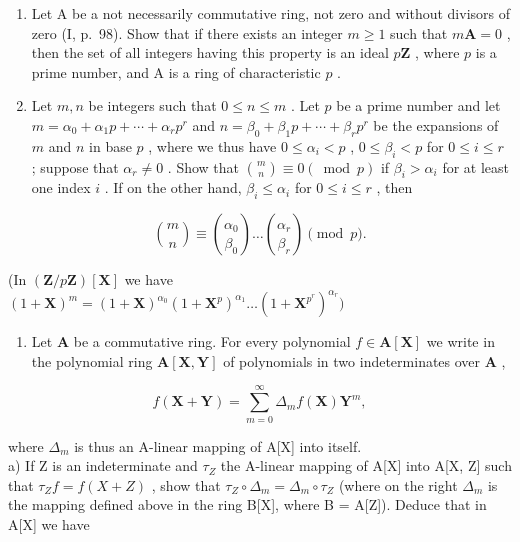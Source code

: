 \BourbakiExerciseGroup

\begin{enumerate}
\def\labelenumi{\arabic{enumi})}
\item
  Let A be a not necessarily commutative ring, not zero and without divisors of zero (I, p.~98). Show that if there exists an integer \(m \geqslant 1\) such that \(m\mathbf{A} = 0\) , then the set of all integers having this property is an ideal \(p\mathbf{Z}\) , where \(p\) is a prime number, and A is a ring of characteristic \(p\) .
\item
  Let \(m, n\) be integers such that \(0 \leqslant n \leqslant m\) . Let \(p\) be a prime number and let \(m = \alpha_0 + \alpha_1p + \cdots + \alpha_rp^r\) and \(n = \beta_0 + \beta_1p + \cdots + \beta_rp^r\) be the expansions of \(m\) and \(n\) in base \(p\) , where we thus have \(0 \leqslant \alpha_i < p\) , \(0 \leqslant \beta_i < p\) for \(0 \leqslant i \leqslant r\) ; suppose that \(\alpha_r \neq 0\) . Show that \(\binom{m}{n} \equiv 0 (\bmod p)\) if \(\beta_i > \alpha_i\) for at least one index \(i\) . If on the other hand, \(\beta_i \leqslant \alpha_i\) for \(0 \leqslant i \leqslant r\) , then
\end{enumerate}

\[
\binom {m} {n} \equiv \binom {\alpha_ {0}} {\beta_ {0}} \dots \binom {\alpha_ {r}} {\beta_ {r}} \pmod {p}  .
\]

(In \((\mathbf{Z} / p\mathbf{Z})[\mathbf{X}]\) we have \((1 + \mathbf{X})^m = (1 + \mathbf{X})^{\alpha_0}(1 + \mathbf{X}^p)^{\alpha_1}\dots (1 + \mathbf{X}^{p^r})^{\alpha_r})\)

\begin{enumerate}
\def\labelenumi{\arabic{enumi})}
\setcounter{enumi}{2}
\tightlist
\item
  Let \(\mathbf{A}\) be a commutative ring. For every polynomial \(f \in \mathbf{A}[\mathbf{X}]\) we write in the polynomial ring \(\mathbf{A}[\mathbf{X}, \mathbf{Y}]\) of polynomials in two indeterminates over \(\mathbf{A}\) ,
\end{enumerate}

\[
f (\mathbf {X} + \mathbf {Y}) = \sum_ {m = 0} ^ {\infty} \Delta_ {m} f (\mathbf {X}) \mathbf {Y} ^ {m},
\]

where \(\Delta_{m}\) is thus an A-linear mapping of A{[}X{]} into itself.\\
a) If Z is an indeterminate and \(\tau_{Z}\) the A-linear mapping of A{[}X{]} into A{[}X, Z{]} such that \(\tau_{Z}f = f(X + Z)\) , show that \(\tau_{Z} \circ \Delta_{m} = \Delta_{m} \circ \tau_{Z}\) (where on the right \(\Delta_{m}\) is the mapping defined above in the ring B{[}X{]}, where B = A{[}Z{]}). Deduce that in A{[}X{]} we have

